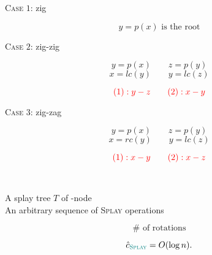 \begin{frame}{}

  \vspace{0.30cm}
  \centerline{\textsc{Case $1$}: zig}
  \[
    y = p(x) \text{ is the root}
  \]
\end{frame}

\begin{frame}{}

  \vspace{0.30cm}
  \centerline{\textsc{Case $2$}: zig-zig}
  \[
    y = p(x) \qquad z = p(y)
  \]
  \[
    x = lc(y) \qquad y = lc(z)
  \]

  \pause
  \[
    \textcolor{red}{(1): y - z \qquad (2): x - y}
  \]
\end{frame}

\begin{frame}{}

  \vspace{0.30cm}
  \centerline{\textsc{Case $3$}: zig-zag}
  \[
    y = p(x) \qquad z = p(y)
  \]
  \[
    x = rc(y) \qquad y = lc(z)
  \]

  \pause
  \[
    \textcolor{red}{(1): x - y \qquad (2): x - z}
  \]
\end{frame}

\begin{frame}{}

  \pause
\end{frame}

\begin{frame}{}
  \begin{center}
     \\[30pt] \pause

    A splay tree $T$ of -node \\[6pt]
    An arbitrary sequence of  \textsc{Splay} operations
  \end{center}

  \pause
  \[
    \# \text{ of rotations}
  \]

  \pause
  \vspace{0.50cm}
  \begin{theorem}
    \[
      \hat{c}_{\textsc{\textcolor{teal}{Splay}}} = O(\log n).
    \]
  \end{theorem}
\end{frame}

